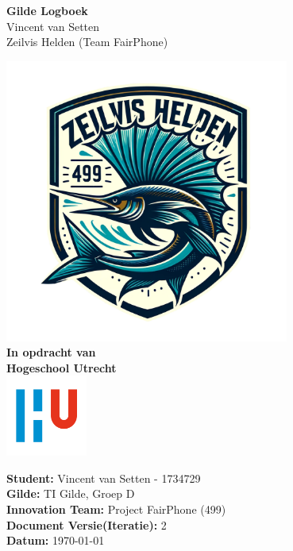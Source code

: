 \documentclass[a4paper]{report}
\newcommand{\latestVersion}{2}
\begin{document}
\begin{titlepage}
  \begin{center}
      \vspace*{.6cm}
      \Huge
      \textbf{ Gilde Logboek }\\
      \vspace{0.2cm}
      \small Vincent van Setten \\
      \small Zeilvis Helden (Team FairPhone)

      \normalsize


      \vspace{1cm}
      \includegraphics[width=0.7\textwidth]{Images/zeilvis_helden.png}
      \vspace{1cm}
      \Large\\
      \textbf{In opdracht van}\\
      \large
      \textbf{Hogeschool Utrecht} \\
      \includegraphics[width=0.2\textwidth]{Images/logouni.png}


      \vfill
    \end{center}
      \textbf{Student:} Vincent van Setten - 1734729 \\
      \textbf{Gilde:} TI Gilde, Groep D\\
      \textbf{Innovation Team:} Project FairPhone (499) \\
      \textbf{Document Versie(Iteratie):} \latestVersion \\
      \textbf{Datum:} \today \\
      \vspace{2cm}
\end{titlepage}
\end{document}
